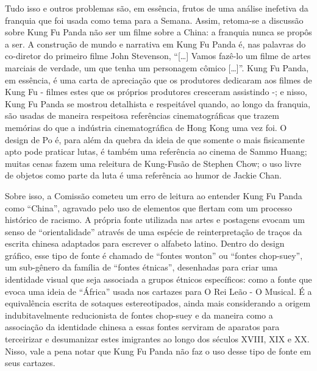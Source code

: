 Tudo isso e outros problemas são, em essência, frutos de uma análise inefetiva da franquia que foi usada como tema para a Semana. Assim, retoma-se a discussão sobre Kung Fu Panda não ser um filme sobre a China: a franquia nunca se propôs a ser. A construção de mundo e narrativa em Kung Fu Panda é, nas palavras do co-diretor do primeiro filme John Stevenson, “[…​] Vamos fazê-lo um filme de artes marciais de verdade, um que tenha um personagem cômico […​]”. Kung Fu Panda, em essência, é uma carta de apreciação que os produtores dedicaram aos filmes de Kung Fu - filmes estes que os próprios produtores cresceram assistindo -; e nisso, Kung Fu Panda se mostrou detalhista e respeitável quando, ao longo da franquia, são usadas de maneira respeitosa referências cinematográficas que trazem memórias do que a indústria cinematográfica de Hong Kong uma vez foi. O design de Po é, para além da quebra da ideia de que somente o mais fisicamente apto pode praticar lutas, é também uma referência ao cinema de Sammo Huang; muitas cenas fazem uma releitura de Kung-Fusão de Stephen Chow; o uso livre de objetos como parte da luta é uma referência ao humor de Jackie Chan.

Sobre isso, a Comissão cometeu um erro de leitura ao entender Kung Fu Panda como “China”, agravado pelo uso de elementos que flertam com um processo histórico de racismo. A própria fonte utilizada nas artes e postagens evocam um senso de “orientalidade” através de uma espécie de reinterpretação de traços da escrita chinesa adaptados para escrever o alfabeto latino. Dentro do design gráfico, esse tipo de fonte é chamado de “fontes wonton” ou “fontes chop-suey”, um sub-gênero da família de “fontes étnicas”, desenhadas para criar uma identidade visual que seja associada a grupos étnicos específicos: como a fonte que evoca uma ideia de “África” usada nos cartazes para O Rei Leão - O Musical. É a equivalência escrita de sotaques estereotipados, ainda mais considerando a origem indubitavelmente reducionista de fontes chop-suey e da maneira como a associação da identidade chinesa a essas fontes serviram de aparatos para terceirizar e desumanizar estes imigrantes ao longo dos séculos XVIII, XIX e XX. Nisso, vale a pena notar que Kung Fu Panda não faz o uso desse tipo de fonte em seus cartazes. 

